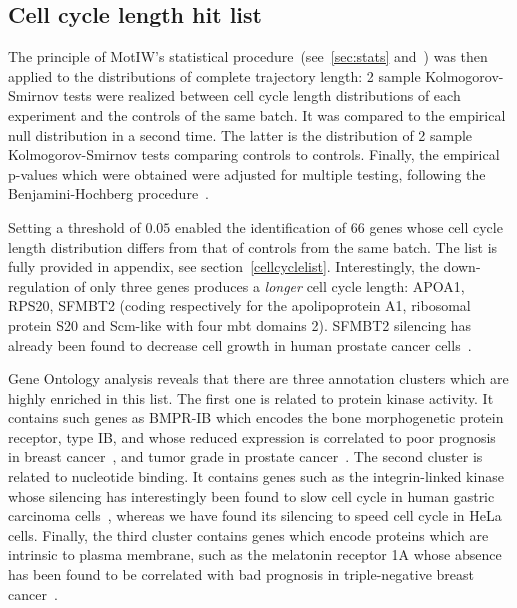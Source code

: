 \subsection{Cell cycle length hit list}
The principle of MotIW's statistical procedure~(see~\ref{sec:stats} and~\cite{motiw}) was then applied to the distributions of complete trajectory length: 2 sample Kolmogorov-Smirnov tests were realized between cell cycle length distributions of each experiment and the controls of the same batch. It was compared to the empirical null distribution in a second time. The latter is the distribution of 2 sample Kolmogorov-Smirnov tests comparing controls to controls. Finally, the empirical p-values which were obtained were adjusted for multiple testing, following the Benjamini-Hochberg procedure~\cite{Benjamini1}.

Setting a threshold of $0.05$ enabled the identification of 66 genes whose cell cycle length distribution differs from that of controls from the same batch. The list is fully provided in appendix, see section~\ref{cellcyclelist}. Interestingly, the down-regulation of only three genes produces a \textit{longer} cell cycle length: APOA1, RPS20, SFMBT2 (coding respectively for the apolipoprotein A1, ribosomal protein S20 and Scm-like with four mbt domains 2). SFMBT2 silencing has already been found to decrease cell growth in human prostate cancer cells~\cite{pmid23385818}. 

Gene Ontology analysis reveals that there are three annotation clusters which are highly enriched in this list. The first one is related to protein kinase activity. It contains such genes as BMPR-IB which encodes the bone morphogenetic protein receptor, type IB, and whose reduced expression is correlated to poor prognosis in breast cancer~\cite{pmid19451094}, and tumor grade in prostate cancer~\cite{pmid10850425}. The second cluster is related to nucleotide binding. It contains genes such as the integrin-linked kinase whose silencing has interestingly been found to slow cell cycle in human gastric carcinoma cells~\cite{pmid23748822}, whereas we have found its silencing to speed cell cycle in HeLa cells. Finally, the third cluster contains genes which encode proteins which are intrinsic to plasma membrane, such as the melatonin receptor 1A whose absence has been found to be correlated with bad prognosis in triple-negative breast cancer~\cite{pmid23250547}.  

